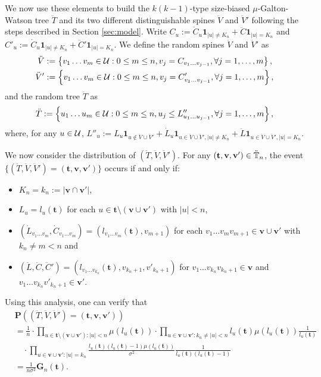 \documentclass[12pt]{amsart}
\numberwithin{equation}{section}
\newcommand{\ind}[1]{\mathbf 1_{#1}}
\newcommand{\prob}{\mathbf P}
\newcommand{\abs}[1]{\left| #1 \right|}
\newcommand{\set}[1]{\left\{ #1 \right\}}
\newcommand{\tree}{\mathbf t}
\newcommand{\spine}{\mathbf v}
\newcommand{\bG}{\mathbf G}\newcommand{\bbG}{\mathbb G}\newcommand{\cG}{\mathcal G}
\begin{document}
	We now use these elements to build the $k(k-1)$-type size-biased $\mu$-Galton-Watson tree $\ddot T$ and its two different distinguishable spines $\ddot V$ and $\ddot V'$ following the steps described in Section \ref{sec:model}.
	Write $C_u:=\dot C_u\ind{|u|\neq K_n}+\ddot C\ind{|u|=K_n}$ and $C'_u:=\dot C_u\ind{|u|\neq K_n}+\ddot C'\ind{|u|=K_n}$.
	We define the random spines $\ddot V$ and $\ddot V'$ as
\begin{align*}
        \ddot V
	&:=
				\set{v_1\dots v_m\in \cU:0\le m\le n, v_j= C_{v_1\dots v_{j-1}},\forall j=1,\dots,m},
	\\
		\ddot V'
	&:=
		\set{v_1\dots v_m\in \cU:0\le m \le n, v_j= C'_{v_1\dots v_{j-1}},\forall j=1,\dots,m},
\end{align*}
	and the random tree $\ddot T$ as
\begin{equation*}
	    \ddot T
	:=
		\set{u_1\dots u_m\in\cU: 0\le m\le n,u_j\leq L''_{u_1\dots u_{j-1}},\forall j=1,\dots,m},
\end{equation*}
	where, for any $u\in\mathcal U$, $L''_u:=L_u \ind{u\not\in \ddot V\cup\ddot V'}+\dot L_u \ind{u\in \ddot V\cup\ddot V',|u|\neq K_n}+\ddot L\ind{u\in \ddot V\cup\ddot V',|u|=K_n}$.
\par
	We now consider the distribution of $(\ddot T,\ddot V,\ddot V')$. For any $(\tree,\spine,\spine')\in\ddot\bbT_n$, the event $\{(\ddot T,\ddot V,\ddot V')=(\tree,\spine,\spine')\}$ occurs if and only if:
\begin{itemize}
\item
    $K_n=k_n:=|\spine\cap\spine'|$,
\item
    $L_u=l_u(\tree)$ for each $u\in \tree\setminus(\spine\cup\spine')$ with $\abs{u}<n$,
\item
	$(\dot L_{v_1\dots v_m},\dot C_{v_1\dots v_m})=(l_{v_1\dots v_m}(\tree),v_{m+1})$ for each $v_1\dots v_mv_{m+1}\in\spine\cup\spine'$ with $k_n\neq m<n$ and
\item
	$(\ddot L,\ddot C,\ddot C')=(l_{v_1\dots v_{k_n}}(\tree),v_{k_n+1},v'_{k_n+1})$ for $v_1\dots v_{k_n}v_{k_n+1}\in\spine$ and $v_1\dots v_{k_n}v'_{k_n+1}\in\spine'$.
\end{itemize}
	Using this analysis, one can verify that
\begin{align*}
		&\prob\left((\ddot T,\ddot V,\ddot V')=(\tree,\spine,\spine')\right)\\
	&= \frac{1}{n} \cdot
		\prod_{u\in \tree\setminus(\spine\cup \spine'):|u|<n} \mu(l_u(\tree))
	\cdot
    	\prod_{u\in \spine\cup \spine':k_n\neq|u|<n}l_u(\tree)
    	\mu(l_u(\tree))\frac{1}{l_u(\tree)}
    \\&\quad\cdot
		\prod_{u\in \spine\cup \spine':|u|=k_n}\frac{l_u(\tree)(l_u(\tree)-1)
		\mu(l_u(\tree))}{\sigma^2}\frac{1}{l_u(\tree)(l_u(\tree)-1)}\\
	&=
		\frac{1}{n\sigma^2}
		\bG_n(\tree).
\end{align*}
\end{document}

